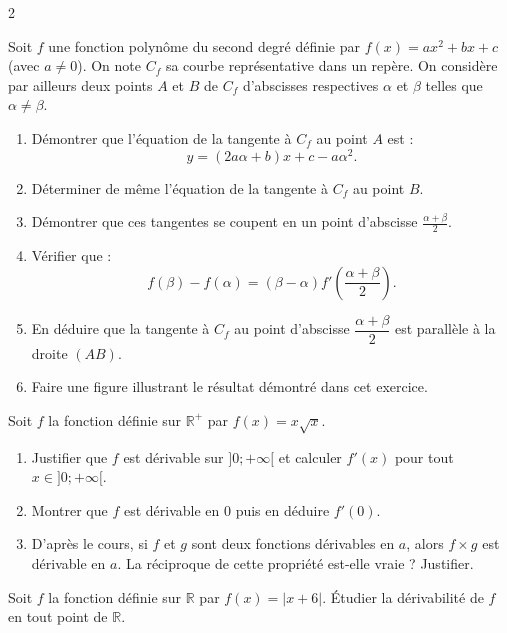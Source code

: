 \documentclass[a4paper,12pt]{article}
\begin{document}
\begin{multicols}{2}
    \begin{exercice}[title=Exercice 16 $\quad \star \star \quad$ { [Représenter, Calculer] }]{}{}
    Soit $f$ une fonction polynôme du second degré définie par $f(x) = ax^2 + bx + c$ (avec $a \neq 0$). On note $C_f$ sa courbe représentative dans un repère. On considère par ailleurs deux points $A$ et $B$ de $C_f$ d’abscisses respectives $\alpha$ et $\beta$ telles que $\alpha \neq \beta$.
    \begin{enumerate}
        \item[(a)] Démontrer que l’équation de la tangente à $C_f$ au point $A$ est :
        \[
        y = (2a\alpha + b)x + c - a\alpha^2.
        \]
        \item[(b)] Déterminer de même l’équation de la tangente à $C_f$ au point $B$.
        \item Démontrer que ces tangentes se coupent en un point d’abscisse $\frac{\alpha + \beta}{2}$.
        \item Vérifier que :
        \[
        f(\beta) - f(\alpha) = (\beta - \alpha) f'\left(\frac{\alpha + \beta}{2}\right).
        \]
        \item En déduire que la tangente à $C_f$ au point d’abscisse $\dfrac{\alpha + \beta}{2}$ est parallèle à la droite $(AB)$.
        \item Faire une figure illustrant le résultat démontré dans cet exercice.
    \end{enumerate}
    \end{exercice}    

\begin{exercice}[title=Exercice 17 $\quad \star \star \quad$ { [Calculer, Raisonner] }]{}{}
    Soit $f$ la fonction définie sur $\mathbb{R}^+$ par $f(x) = x\sqrt{x}$.
    \begin{enumerate}
        \item Justifier que $f$ est dérivable sur $]0; +\infty[$ et calculer $f'(x)$ pour tout $x \in ]0; +\infty[$.
        \item Montrer que $f$ est dérivable en $0$ puis en déduire $f'(0)$.
        \item D’après le cours, si $f$ et $g$ sont deux fonctions dérivables en $a$, alors $f \times g$ est dérivable en $a$. La réciproque de cette propriété est-elle vraie ? Justifier.
    \end{enumerate}
    \end{exercice}
    
    \begin{exercice}[title=Exercice 18 $\quad \star \star \star \quad$ { [Calculer, Raisonner] }]{}{}
    Soit $f$ la fonction définie sur $\mathbb{R}$ par $f(x) = |x + 6|$. Étudier la dérivabilité de $f$ en tout point de $\mathbb{R}$.
    \end{exercice}
    

\end{multicols}
\end{document}
